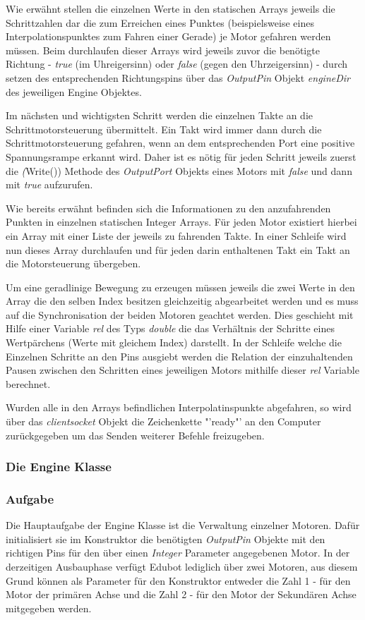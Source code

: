 \begin{itemize}
Wie erwähnt stellen die einzelnen Werte in den statischen Arrays jeweils die Schrittzahlen dar die zum Erreichen eines Punktes (beispielsweise eines Interpolationspunktes zum Fahren einer Gerade) je Motor gefahren werden müssen. Beim durchlaufen dieser Arrays wird jeweils zuvor die benötigte Richtung - \textit{true} (im Uhreigersinn) oder \textit{false} (gegen den Uhrzeigersinn) - durch setzen des entsprechenden Richtungspins über das \textit{OutputPin} Objekt \textit{engineDir} des jeweiligen Engine Objektes.

Im nächsten und wichtigsten Schritt werden die einzelnen Takte an die Schrittmotorsteuerung übermittelt. Ein Takt wird immer dann durch die Schrittmotorsteuerung gefahren, wenn an dem entsprechenden Port eine positive Spannungsrampe erkannt wird. Daher ist es nötig für jeden Schritt jeweils zuerst die \textit(Write()) Methode des \textit{OutputPort} Objekts eines Motors mit \textit{false} und dann mit \textit{true} aufzurufen.

Wie bereits erwähnt befinden sich die Informationen zu den anzufahrenden Punkten in einzelnen statischen Integer Arrays. Für jeden Motor existiert hierbei ein Array mit einer Liste der jeweils zu fahrenden Takte. In einer Schleife wird nun dieses Array durchlaufen und für jeden darin enthaltenen Takt ein Takt an die Motorsteuerung übergeben.

Um eine geradlinige Bewegung zu erzeugen müssen jeweils die zwei Werte in den Array die den selben Index besitzen gleichzeitig abgearbeitet werden und es muss auf die Synchronisation der beiden Motoren geachtet werden. Dies geschieht mit Hilfe einer Variable \textit{rel} des Typs \textit{double} die das Verhältnis der Schritte eines Wertpärchens (Werte mit gleichem Index) darstellt. In der Schleife welche die Einzelnen Schritte an den Pins ausgiebt werden die Relation der einzuhaltenden Pausen zwischen den Schritten eines jeweiligen Motors mithilfe dieser \textit{rel} Variable berechnet.

Wurden alle in den Arrays befindlichen Interpolatinspunkte abgefahren, so wird über das \textit{clientsocket} Objekt die Zeichenkette "'ready"' an den Computer zurückgegeben um das Senden weiterer Befehle freizugeben.

\end{itemize}

\subsubsection{Die Engine Klasse}
\subsubsection{Aufgabe}
Die Hauptaufgabe der Engine Klasse ist die Verwaltung einzelner Motoren. Dafür initialisiert sie im Konstruktor die benötigten \textit{OutputPin} Objekte mit den richtigen Pins für den über einen \textit{Integer} Parameter angegebenen Motor. In der derzeitigen Ausbauphase verfügt Edubot lediglich über zwei Motoren, aus diesem Grund können als Parameter für den Konstruktor entweder die Zahl 1 - für den Motor der primären Achse und die Zahl 2 - für den Motor der Sekundären Achse mitgegeben werden.


